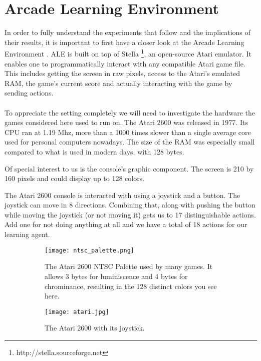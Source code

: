 \section{Arcade Learning Environment}
\label{sec:arcade_learning_environment}
In order to fully understand the experiments that follow
and the implications of their results,
it is important to first have a closer
look at the Arcade Learning Environment
\parencite{bellemare13arcade}.
ALE is built on top of Stella
\footnote{http://stella.sourceforge.net},
an open-source Atari emulator.
It enables one to programmatically interact
with any compatible Atari game file.
This includes getting the screen in raw pixels,
access to the Atari's emulated RAM,
the game's current score
and actually interacting with the game by sending actions.

\paragraph{}
To appreciate the setting completely we will need to
investigate the hardware the games considered here used to run on.
The Atari 2600 was released in 1977.
Its CPU ran at 1.19 Mhz,
more than a 1000 times slower
than a single average core used for personal computers nowadays.
The size of the RAM was especially small compared to
what is used in modern days, with 128 bytes.

Of special interest to us is the console's graphic component.
The screen is 210 by 160 pixels
and could display up to 128 colors.

The Atari 2600 console is interacted with using
a joystick and a button.
The joystick can move in 8 directions.
Combining that,
along with pushing the button
while moving the joystick
(or not moving it)
gets us to 17 distinguishable actions.
Add one for not doing anything at all
and we have a total of 18 actions for our learning agent.

\begin{figure}[h]
\center
\begin{subfigure}[t]{.5\textwidth}
  \centering
  \texttt{[image: ntsc\_palette.png]}
  \vspace{.1\baselineskip}
  \caption{
    The Atari 2600 NTSC Palette used by many games.
    It allows 3 bytes for luminiscence
    and 4 bytes for chrominance,
    resulting in the 128 distinct colors
    you see here.
  }
  \label{fig:ntsc_palette}
\end{subfigure}
\hfill
\begin{subfigure}[t]{.4\textwidth}
  \centering
  \texttt{[image: atari.jpg]}
  \vspace{.1\baselineskip}
  \caption{
    The Atari 2600 with its joystick.
  }
  \label{fig:atari}
\end{subfigure}
\caption{}
\label{fig:dqn_networks}
\end{figure}

